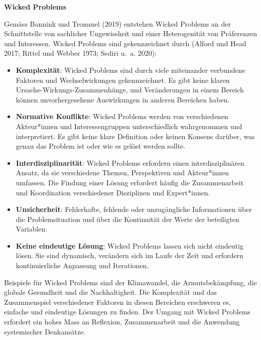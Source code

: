 \documentclass[
  nswissgerman,
  a4paper,
  openany]{book}
\begin{document}
\begin{tcolorbox}[enhanced jigsaw, arc=.35mm, bottomrule=.15mm, breakable, colback=white, colframe=quarto-callout-note-color-frame, left=2mm, leftrule=.75mm, opacityback=0, rightrule=.15mm, toprule=.15mm]

\vspace{-3mm}\textbf{Wicked Problems}\vspace{3mm}

Gemäss Bannink und Trommel (2019) entstehen Wicked Problems an der
Schnittstelle von sachlicher Ungewissheit und einer Heterogenität von
Präferenzen und Interessen. Wicked Problems sind gekennzeichnet durch
(Alford und Head 2017; Rittel und Webber 1973; Sediri u.~a. 2020):

\begin{itemize}
\item
  \textbf{Komplexität}: Wicked Problems sind durch viele miteinander
  verbundene Faktoren und Wechselwirkungen gekennzeichnet. Es gibt keine
  klaren Ursache-Wirkungs-Zusammenhänge, und Veränderungen in einem
  Bereich können unvorhergesehene Auswirkungen in anderen Bereichen
  haben.
\item
  \textbf{Normative Konflikte}: Wicked Problems werden von verschiedenen
  Akteur*innen und Interessengruppen unterschiedlich wahrgenommen und
  interpretiert. Es gibt keine klare Definition oder keinen Konsens
  darüber, was genau das Problem ist oder wie es gelöst werden sollte.
\item
  \textbf{Interdisziplinarität}: Wicked Problems erfordern einen
  interdisziplinären Ansatz, da sie verschiedene Themen, Perspektiven
  und Akteur*innen umfassen. Die Findung einer Lösung erfordert häufig
  die Zusammenarbeit und Koordination verschiedener Disziplinen und
  Expert*innen.
\item
  \textbf{Unsicherheit}: Fehlerhafte, fehlende oder unzugängliche
  Informationen über die Problemsituation und über die Kontinuität der
  Werte der beteiligten Variablen.
\item
  \textbf{Keine eindeutige Lösung}: Wicked Problems lassen sich nicht
  eindeutig lösen. Sie sind dynamisch, verändern sich im Laufe der Zeit
  und erfordern kontinuierliche Anpassung und Iterationen.
\end{itemize}

Beispiele für Wicked Problems sind der Klimawandel, die
Armutsbekämpfung, die globale Gesundheit und die Nachhaltigkeit. Die
Komplexität und das Zusammenspiel verschiedener Faktoren in diesen
Bereichen erschweren es, einfache und eindeutige Lösungen zu finden. Der
Umgang mit Wicked Problems erfordert ein hohes Mass an Reflexion,
Zusammenarbeit und die Anwendung systemischer Denkansätze.

\end{tcolorbox}
\end{document}
